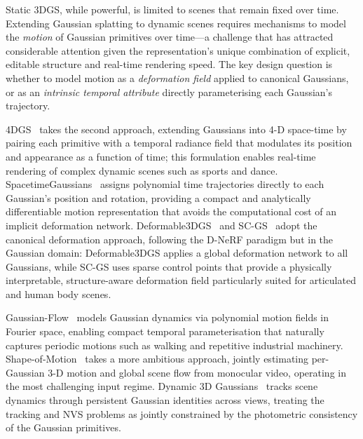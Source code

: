 Static 3DGS, while powerful, is limited to scenes that remain fixed over
time.
Extending Gaussian splatting to dynamic scenes requires mechanisms to model
the \emph{motion} of Gaussian primitives over time---a challenge that has
attracted considerable attention given the representation's unique combination
of explicit, editable structure and real-time rendering speed.
The key design question is whether to model motion as a \emph{deformation field}
applied to canonical Gaussians, or as an \emph{intrinsic temporal attribute}
directly parameterising each Gaussian's trajectory.

4DGS~\citep{wu2024_4dgs} takes the second approach, extending Gaussians into
4-D space-time by pairing each primitive with a temporal radiance field that
modulates its position and appearance as a function of time; this formulation
enables real-time rendering of complex dynamic scenes such as sports and dance.
SpacetimeGaussians~\citep{yang2024spacetime} assigns polynomial time
trajectories directly to each Gaussian's position and rotation, providing
a compact and analytically differentiable motion representation that avoids
the computational cost of an implicit deformation network.
Deformable3DGS~\citep{yang2024deformable} and SC-GS~\citep{huang2024scgs}
adopt the canonical deformation approach, following the D-NeRF paradigm but
in the Gaussian domain: Deformable3DGS applies a global deformation network
to all Gaussians, while SC-GS uses sparse control points that provide a
physically interpretable, structure-aware deformation field particularly
suited for articulated and human body scenes.

Gaussian-Flow~\citep{lin2024gaussianflow} models Gaussian dynamics via
polynomial motion fields in Fourier space, enabling compact temporal
parameterisation that naturally captures periodic motions such as walking
and repetitive industrial machinery.
Shape-of-Motion~\citep{wang2024shapeofmotion} takes a more ambitious approach,
jointly estimating per-Gaussian 3-D motion and global scene flow from
monocular video, operating in the most challenging input regime.
Dynamic 3D Gaussians~\citep{luiten2024dynamic3dgs} tracks scene dynamics
through persistent Gaussian identities across views, treating the tracking
and NVS problems as jointly constrained by the photometric consistency of
the Gaussian primitives.

